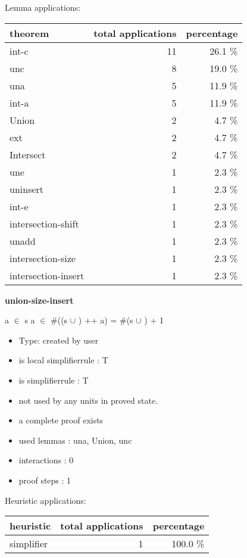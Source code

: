 \documentclass[a4paper]{article}
\begin{document}
Lemma applications:

\begin{supertabular}{l|r|r}
theorem	        & total applications & percentage \\ \hline
int-c & 11 & 26.1 \% \\
unc & 8 & 19.0 \% \\
una & 5 & 11.9 \% \\
int-a & 5 & 11.9 \% \\
Union & 2 & 4.7 \% \\
ext & 2 & 4.7 \% \\
Intersect & 2 & 4.7 \% \\
une & 1 & 2.3 \% \\
uninsert & 1 & 2.3 \% \\
int-e & 1 & 2.3 \% \\
intersection-shift & 1 & 2.3 \% \\
unadd & 1 & 2.3 \% \\
intersection-size & 1 & 2.3 \% \\
intersection-insert & 1 & 2.3 \% \\

\end{supertabular}
\pagebreak

{\LARGE\bf union-size-insert}\label{lemma-union-size-insert}

\medskip

 \Fol \Not a $\in$ s \And \Not a $\in$  \Imp \#((s $\cup$ ) ++ a) = \#(s $\cup$ ) + 1

\begin{itemize}

\item Type: created by user

\item is local simplifierrule : T
\item is simplifierrule : T
\item not used by any units in proved state.
\item       a complete proof exists
\item       used lemmas  : una, Union, unc
\item       interactions : 0
\item       proof steps  : 1
\end{itemize}

\medskip


Heuristic applications:

\begin{supertabular}{l|r|r}
heuristic	& total applications & percentage \\ \hline
simplifier & 1 & 100.0 \% \\

\end{supertabular}
\end{document}
